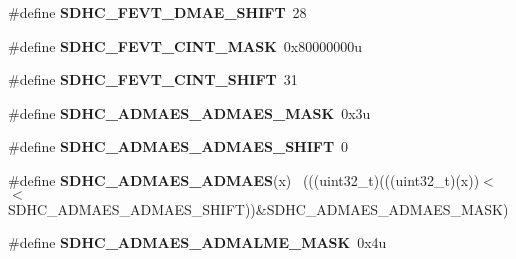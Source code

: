 \begin{DoxyCompactItemize}
\item 
\hypertarget{group___s_d_h_c___register___masks_ga5899ac8c06de1bf1164fb10a8ee67bde}{}\#define {\bfseries S\+D\+H\+C\+\_\+\+F\+E\+V\+T\+\_\+\+D\+M\+A\+E\+\_\+\+S\+H\+I\+F\+T}~28\label{group___s_d_h_c___register___masks_ga5899ac8c06de1bf1164fb10a8ee67bde}

\item 
\hypertarget{group___s_d_h_c___register___masks_gab421860ddd2b50ee334649e5cf9f4475}{}\#define {\bfseries S\+D\+H\+C\+\_\+\+F\+E\+V\+T\+\_\+\+C\+I\+N\+T\+\_\+\+M\+A\+S\+K}~0x80000000u\label{group___s_d_h_c___register___masks_gab421860ddd2b50ee334649e5cf9f4475}

\item 
\hypertarget{group___s_d_h_c___register___masks_ga0eb0abd3e2107c4b5d2dc801b3b1a067}{}\#define {\bfseries S\+D\+H\+C\+\_\+\+F\+E\+V\+T\+\_\+\+C\+I\+N\+T\+\_\+\+S\+H\+I\+F\+T}~31\label{group___s_d_h_c___register___masks_ga0eb0abd3e2107c4b5d2dc801b3b1a067}

\item 
\hypertarget{group___s_d_h_c___register___masks_gaaf2deb9a73e0aeecdc0ee08497d0165b}{}\#define {\bfseries S\+D\+H\+C\+\_\+\+A\+D\+M\+A\+E\+S\+\_\+\+A\+D\+M\+A\+E\+S\+\_\+\+M\+A\+S\+K}~0x3u\label{group___s_d_h_c___register___masks_gaaf2deb9a73e0aeecdc0ee08497d0165b}

\item 
\hypertarget{group___s_d_h_c___register___masks_ga3cc649f6ebd779dc84337a9bc5ae5c0d}{}\#define {\bfseries S\+D\+H\+C\+\_\+\+A\+D\+M\+A\+E\+S\+\_\+\+A\+D\+M\+A\+E\+S\+\_\+\+S\+H\+I\+F\+T}~0\label{group___s_d_h_c___register___masks_ga3cc649f6ebd779dc84337a9bc5ae5c0d}

\item 
\hypertarget{group___s_d_h_c___register___masks_gac0a0355da3382219f86a896573abdbd7}{}\#define {\bfseries S\+D\+H\+C\+\_\+\+A\+D\+M\+A\+E\+S\+\_\+\+A\+D\+M\+A\+E\+S}(x)                                    ~(((uint32\+\_\+t)(((uint32\+\_\+t)(x))$<$$<$S\+D\+H\+C\+\_\+\+A\+D\+M\+A\+E\+S\+\_\+\+A\+D\+M\+A\+E\+S\+\_\+\+S\+H\+I\+F\+T))\&S\+D\+H\+C\+\_\+\+A\+D\+M\+A\+E\+S\+\_\+\+A\+D\+M\+A\+E\+S\+\_\+\+M\+A\+S\+K)\label{group___s_d_h_c___register___masks_gac0a0355da3382219f86a896573abdbd7}

\item 
\hypertarget{group___s_d_h_c___register___masks_ga12cecea9616404f0ae9cae658e7c8849}{}\#define {\bfseries S\+D\+H\+C\+\_\+\+A\+D\+M\+A\+E\+S\+\_\+\+A\+D\+M\+A\+L\+M\+E\+\_\+\+M\+A\+S\+K}~0x4u\label{group___s_d_h_c___register___masks_ga12cecea9616404f0ae9cae658e7c8849}


\end{DoxyCompactItemize}
